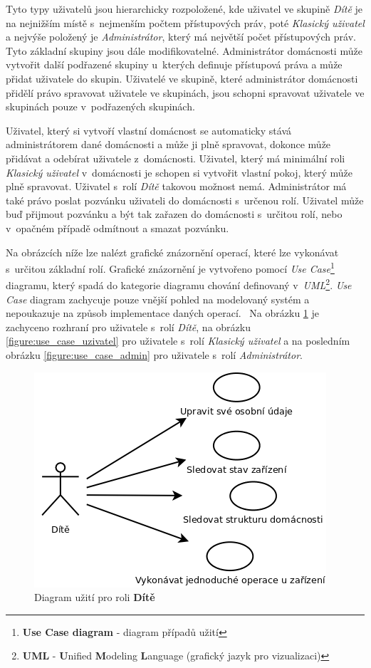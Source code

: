 Tyto typy uživatelů jsou hierarchicky rozpoložené, kde uživatel ve skupině \emph{Dítě} je na nejnižším místě s~nejmenším počtem přístupových práv, poté \emph{Klasický uživatel} a nejvýše položený je \emph{Administrátor}, který má největší počet přístupových práv.
Tyto základní skupiny jsou dále modifikovatelné. Administrátor domácnosti může vytvořit další podřazené skupiny u~kterých definuje přístupová práva a může přidat uživatele do skupin.
Uživatelé ve skupině, které administrátor domácnosti přidělí právo spravovat uživatele ve skupinách, jsou schopni spravovat uživatele ve skupinách pouze v~podřazených skupinách.

Uživatel, který si vytvoří vlastní domácnost se automaticky stává administrátorem dané domácnosti a může ji plně spravovat, dokonce může přidávat a odebírat uživatele z~domácnosti.
Uživatel, který má minimální roli \emph{Klasický uživatel} v~domácnosti je schopen si vytvořit vlastní pokoj, který může plně spravovat. Uživatel s~rolí \emph{Dítě} takovou možnost nemá.
Administrátor má také právo poslat pozvánku uživateli do domácnosti s~určenou rolí.
\newline
Uživatel může buď přijmout pozvánku a být tak zařazen do domácnosti s~určitou rolí, nebo v~opačném případě odmítnout a smazat pozvánku.
\newline

Na obrázcích níže lze nalézt grafické znázornění operací, které lze vykonávat s~určitou základní rolí.
Grafické znázornění je vytvořeno pomocí \emph{Use Case}\footnote{\textbf{Use Case diagram} - diagram případů užití} diagramu, který spadá do kategorie diagramu chování definovaný v~\emph{UML}\footnote{\textbf{UML} - \textbf{U}nified \textbf{M}odeling \textbf{L}anguage (grafický jazyk pro vizualizaci)}.
\emph{Use Case} diagram zachycuje pouze vnější pohled na modelovaný systém a nepoukazuje na způsob implementace daných operací.~\cite{use_case:info}
Na obrázku \ref{figure:use_case_dite} je zachyceno rozhraní pro uživatele s~rolí \emph{Dítě}, na obrázku \ref{figure:use_case_uzivatel} pro uživatele s~rolí \emph{Klasický uživatel} a na posledním obrázku \ref{figure:use_case_admin} pro uživatele s~rolí \emph{Administrátor}.

\begin{figure}[hbt]
  \centering
  \includegraphics[width=0.4 \linewidth]{obrazky-figures/useCaseChild.png}
  \caption{Diagram užití pro roli \textbf{Dítě}}
  \label{figure:use_case_dite}
\end{figure}

